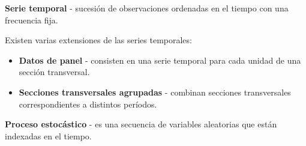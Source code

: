 
\begin{f}[Definiciones]
	
	\textbf{Serie temporal} - sucesión de observaciones ordenadas en el tiempo con una frecuencia fija.
	
	Existen varias extensiones de las series temporales:
	\begin{itemize}[leftmargin=*]
		\item \textbf{Datos de panel} - consisten en una serie temporal para cada unidad de una sección transversal.
		\item \textbf{Secciones transversales agrupadas} - combinan secciones transversales correspondientes a distintos períodos.
	\end{itemize}
	
	\textbf{Proceso estocástico} - es una secuencia de variables aleatorias que están indexadas en el tiempo.
	
\end{f}
	
